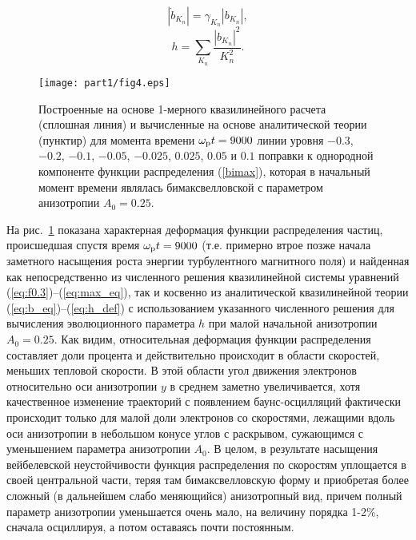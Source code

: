 \begin{equation}
\label{eq:b_eq}
|\dot b_{K_n}|=\gamma_{K_n}|b_{K_n}|, 
\end{equation}
\begin{equation}
\label{eq:h_def}
h=\sum_{K_n}\dfrac{|b_{K_n}|^2}{K_n^2}.
\end{equation}
\begin{figure}[b]
\texttt{[image: part1/fig4.eps]}
\centering
\caption{Построенные на основе 1-мерного квазилинейного расчета (сплошная линия) и вычисленные на основе аналитической теории~\cite{Pokhotelov2011} (пунктир) для момента времени $\omega_\mathrm{p} t = 9000$ линии уровня $-0.3$, $-0.2$, $-0.1$, $-0.05$, $-0.025$, $0.025$, $0.05$ и $0.1$ поправки к однородной компоненте функции распределения (\ref{bimax}), которая в начальный момент времени являлась бимаксвелловской с параметром анизотропии $A_0=0.25$. }
\label{fig:sravnenie_FR1d}
\end{figure}
На рис.~\ref{fig:sravnenie_FR1d} показана характерная деформация функции распределения частиц, происшедшая спустя время $\omega_\mathrm{p} t = 9000$ (т.е. примерно втрое позже начала заметного насыщения роста энергии турбулентного магнитного поля) и найденная как непосредственно из численного решения квазилинейной системы уравнений (\ref{eq:f0.3})--(\ref{eq:max_eq}), так и косвенно из аналитической квазилинейной теории (\ref{eq:b_eq})--(\ref{eq:h_def}) с использованием указанного численного решения для вычисления эволюционного параметра $h$ при малой начальной анизотропии $A_0=0.25$. Как видим, относительная деформация функции распределения составляет доли процента и действительно происходит в области скоростей, меньших тепловой скорости. В этой области угол движения электронов относительно оси анизотропии $y$ в среднем заметно увеличивается, хотя качественное изменение траекторий с появлением баунс-осцилляций фактически происходит только для малой доли электронов со скоростями, лежащими вдоль оси анизотропии в небольшом конусе углов с раскрывом, сужающимся с уменьшением параметра анизотропии $A_0$. В целом, в результате насыщения вейбелевской неустойчивости функция распределения по скоростям уплощается в своей центральной части, теряя там бимаксвелловскую форму и приобретая более сложный (в дальнейшем слабо меняющийся) анизотропный вид, причем полный параметр анизотропии уменьшается очень мало, на величину порядка 1-2\%, сначала осциллируя, а потом оставаясь почти постоянным. 



